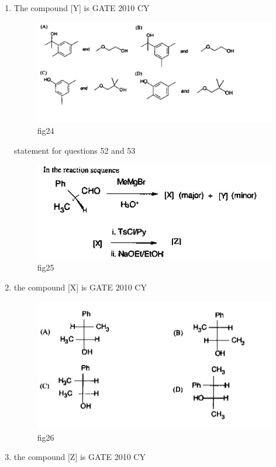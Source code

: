 \documentclass[journal,12pt,onecolumn]{IEEEtran}
\theoremstyle{remark}
\begin{document}
\begin{enumerate}
\item The compound [Y] is
\hfill{GATE 2010 CY}
\begin{figure}[H]
    \centering
    \includegraphics[width=0.75\linewidth]{figs/Q.51.png}
    \caption{fig24}
    \label{fig:figs/Q.51.png}
\end{figure}
statement for questions 52 and 53\\
\begin{figure}[H]
    \centering
    \includegraphics[width=0.75\linewidth]{figs/Q.52.1.png}
    \caption{fig25}
    \label{fig:figs/Q.52.1.png}
\end{figure}
\item 
the compound [X] is
\hfill{GATE 2010 CY}
\begin{figure}[H]
    \centering
    \includegraphics[width=1\linewidth]{figs/Q.52.2.png}
    \caption{fig26}
    \label{fig:figs/Q.52.2.png}
\end{figure}
\item 
the compound [Z] is
\hfill{GATE 2010 CY}

\end{enumerate}
\end{document}
